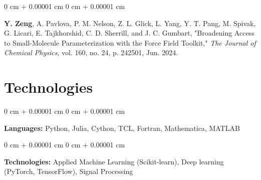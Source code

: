 \documentclass[10pt, letterpaper]{article}
\newenvironment{onecolentry}{
    \begin{adjustwidth}{
        0 cm + 0.00001 cm
    }{
        0 cm + 0.00001 cm
    }
}{
    \end{adjustwidth}
} %
\begin{document}
        \begin{samepage}
            \begin{onecolentry}
                 \textbf{Y. Zeng}, A. Pavlova, P. M. Nelson, Z. L. Glick, L. Yang, Y. T. Pang, M. Spivak, G. Licari, E. Tajkhorshid, C. D. Sherrill, and J. C. Gumbart, "Broadening Access to Small-Molecule Parameterization with the Force Field Toolkit," \textit{The Journal of Chemical Physics}, vol. 160, no. 24, p. 242501, Jun. 2024.
            \end{onecolentry}
        \end{samepage}


    
    \section{Technologies}



        
        \begin{onecolentry}
            \textbf{Languages:} Python, Julia, Cython, TCL, Fortran, Mathematica, MATLAB
        \end{onecolentry}

        \vspace{0.2 cm}

        \begin{onecolentry}
            \textbf{Technologies:} Applied Machine Learning (Scikit-learn), Deep learning (PyTorch, TensorFlow), Signal Processing
        \end{onecolentry}


    
    
\end{document}
